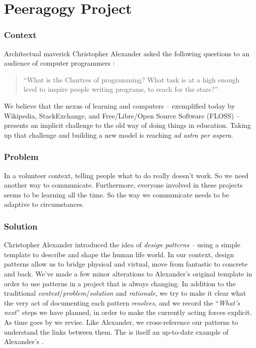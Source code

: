 \section{Peeragogy Project}\label{sec:Peeragogy_Project}

\subsubsection*{Context}  Architectual maverick Christopher Alexander asked the following questions to an audience of computer programmers \cite{alexander1999origins}: 
\begin{quote}
``What is the Chartres of programming? What task is at a high enough level to inspire people writing programs, to reach for the stars?''
\end{quote}
We believe that the nexus of learning and computers -- exemplified today by Wikipedia, StackExchange, and Free/Libre/Open Source Software (FLOSS) -- presents an implicit challenge to the old way of doing things in education.  Taking up that challenge and building a new model is reaching \emph{ad astra per aspera}.  

\subsubsection*{Problem} In a volunteer context, telling people what to do really doesn't work.  So we need another way to communicate.  Furthermore, everyone involved in these projects seems to be learning all the time.  So the way we communicate needs to be adaptive to circumstances.

\subsubsection*{Solution} Christopher Alexander introduced the idea of \emph{design patterns} -- using a simple template to describe and shape the human life world.  In our context, design patterns allow us to bridge physical and virtual, move from fantastic to concrete and back.  We've made a few minor alterations to Alexander's original template in order to use patterns in a project that is always changing.  In addition to the traditional \emph{context}/\emph{problem}/\emph{solution} and \emph{rationale}, we try to make it clear what the very act of documenting each pattern \emph{resolves}, and we record the ``\emph{What's next}'' steps we have planned, in order to make the currently acting forces explicit. As time goes by we revise.  Like Alexander, we cross-reference our patterns to understand the links between them. The  is itself an up-to-date example of Alexander's  \cite[p. 99]{alexander1977pattern}.

